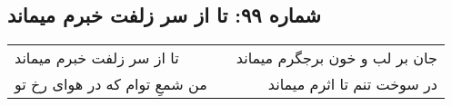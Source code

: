 \begin{center}
\section*{شماره ۹۹: تا از سر‍ زلفت خبرم میماند}
\label{sec:099}
\begin{longtable}{l p{0.5cm} r}
تا از سر‍ زلفت خبرم میماند
&&
جان بر لب و خون برجگرم میماند
\\
من شمعِ توام که در هوای رخ تو
&&
در سوخت تنم تا اثرم میماند
\\
\end{longtable}
\end{center}
